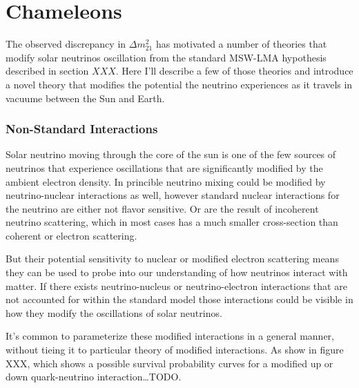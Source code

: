 \chapter{Chameleons}

\ifpdf
    \graphicspath{{chameleons}{chameleons/figures/PDF/}{chameleons/figures/}}
\else
    \graphicspath{{chameleons/figures/EPS/}{chameleons/figures/}}
\fi


The observed discrepancy in $\Delta m^{2}_{21}$ has motivated a number
of theories that modify solar neutrinos oscillation from the standard
MSW-LMA hypothesis described in section $XXX$.
Here I'll describe a few of those theories and introduce a novel theory
that modifies the potential the neutrino experiences as it travels in
vacuume between the Sun and Earth.

\subsection{Non-Standard Interactions}
Solar neutrino moving through the core of the sun is one of the few sources
of neutrinos that experience oscillations that are significantly modified by
the ambient electron density.
In princible neutrino mixing could be modified by neutrino-nuclear interactions
as well, however standard nuclear interactions for the neutrino are either
not flavor sensitive. Or are the result of incoherent neutrino scattering, which
in most cases has a much smaller  cross-section than coherent or electron scattering.


But their potential sensitivity to nuclear or modified electron scattering
means they can be used to probe into our understanding of how neutrinos
interact with matter.
If there exists neutrino-nucleus or neutrino-electron interactions that are
not accounted for within the standard model those interactions could be visible
in how they modify the oscillations of solar neutrinos.


It's common to parameterize these modified interactions in a general manner,
without tieing it to particular theory of modified interactions. As show in
figure XXX, which shows a possible survival probability curves for a modified
up or down quark-neutrino interaction\ldots TODO.\@

